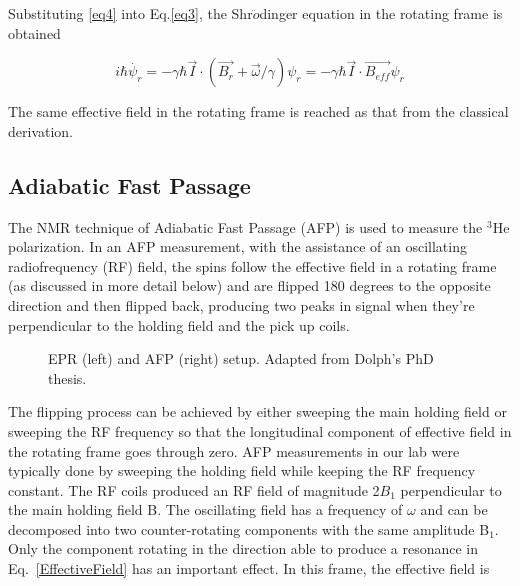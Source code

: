 Substituting \ref{eq4} into Eq.\ref{eq3}, the Shr$\ddot{o}$dinger equation in the rotating frame is obtained

\begin{equation}
i\hbar \dot{\psi_{r}}=-\gamma \hbar \vec{I}\cdot(\vec{B_{r}} + \vec{\omega}/\gamma)\psi_{r}=-\gamma \hbar \vec{I}\cdot\vec{B_{eff}}\psi_{r}
\end{equation}

The same effective field in the rotating frame is reached as that from the classical derivation.

\subsection{Adiabatic Fast Passage}

The NMR technique of Adiabatic Fast Passage (AFP) is used to measure the $^{3}$He polarization. In an AFP measurement, with the assistance of an oscillating radiofrequency (RF) field, the spins follow the effective field in a rotating frame (as discussed in more detail below) and are flipped 180 degrees to the opposite direction and then flipped back, producing two peaks in signal when they're perpendicular to the holding field and the pick up coils.

\begin{figure}[H]
	\centering
	\caption{{ EPR (left) and AFP (right) setup. Adapted from Dolph's PhD thesis.}}
	\label{AFPandEPRsetup}
\end{figure}

The flipping process can be achieved by either sweeping the main holding field or sweeping the RF frequency so that the longitudinal component of effective field in the rotating frame goes through zero. AFP measurements in our lab were typically done by sweeping the holding field while keeping the RF frequency constant. The RF coils produced an RF field of magnitude 2$B_{1}$ perpendicular to the main holding field B. The oscillating field has a frequency of $\omega$ and can be decomposed into two counter-rotating components with the same amplitude B$_{1}$. Only the component rotating in the direction able to produce a resonance in Eq.~\ref{EffectiveField} has an important effect. In this frame, the effective field is

